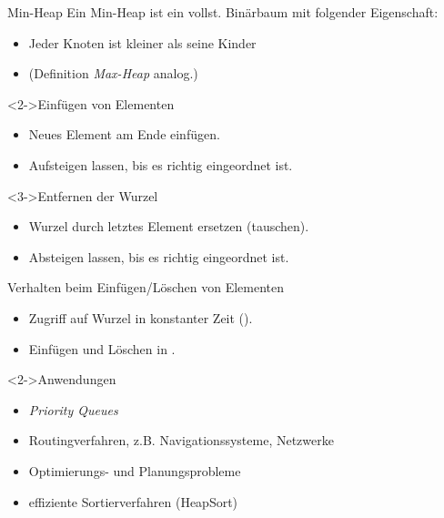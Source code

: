 \begin{frame}
    \begin{defblock}{Min-Heap}
        Ein Min-Heap ist ein vollst. Binärbaum mit folgender Eigenschaft:
        \begin{itemize}
            \item Jeder Knoten ist kleiner als seine Kinder
            \item (Definition \emph{Max-Heap} analog.)
        \end{itemize}
    \end{defblock}
    \begin{block}<2->{Einfügen von Elementen}
        \begin{itemize}
            \item Neues Element am Ende einfügen.
            \item Aufsteigen lassen, bis es richtig eingeordnet ist.
        \end{itemize}
    \end{block}
    \begin{block}<3->{Entfernen der Wurzel}
        \begin{itemize}
            \item Wurzel durch letztes Element ersetzen (tauschen).
            \item Absteigen lassen, bis es richtig eingeordnet ist.
        \end{itemize}
    \end{block}
\end{frame}

\begin{frame}
    \begin{block}{Verhalten beim Einfügen/Löschen von Elementen}
        \begin{itemize}
            \item Zugriff auf Wurzel in konstanter Zeit (\oconst).
            \item Einfügen und Löschen in \olog.
        \end{itemize}
    \end{block}
    \begin{block}<2->{Anwendungen}
        \begin{itemize}
            \item \emph{Priority Queues}
            \item Routingverfahren, z.B. Navigationssysteme, Netzwerke
            \item Optimierungs- und Planungsprobleme
            \item effiziente Sortierverfahren (HeapSort)
        \end{itemize}
    \end{block}
\end{frame}
